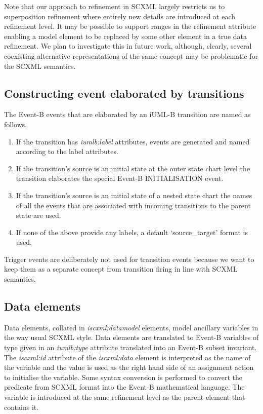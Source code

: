 Note that our approach to refinement in SCXML largely restricts us to superposition 
refinement where entirely new details are introduced at each refinement level.  
It may be possible to support ranges in the refinement attribute enabling a model 
element to be replaced by some other element in a true data refinement. We plan to 
investigate this in future work, although, clearly, several coexisting alternative 
representations of the same concept may be problematic for the SCXML semantics.

\subsection{Constructing event elaborated by transitions}
The Event-B events that are elaborated by an iUML-B  transition are named as follows. 

\begin{enumerate}
\item If the transition has \emph{iumlb:label} attributes, events are generated 
and named according to the label attributes.
\item If the transition's source is an initial state at the outer state chart 
level the transition elaborates the special Event-B INITIALISATION event. 
\item If the transition's source is an initial state of a nested state chart 
the names of all the events that are associated with incoming transitions to 
the parent state are used.
\item If none of the above provide any labels, a default  `source\_target' format is used.
\end{enumerate}

Trigger events are deliberately not used for transition events because we 
want to keep them as a separate concept from transition firing in line 
with SCXML semantics.

\subsection{Data elements}
Data elements, collated in \emph{iscxml:datamodel} elements, model ancillary 
variables in the way usual SCXML style. Data elements are translated to 
Event-B variables of type given in an \emph{iumlb:type} attribute translated 
into an Event-B subset invariant.  The \emph{iscxml:id} attribute of the 
\emph{iscxml:data} element is interpreted as the name of the variable and 
the value is used as the right hand side of an assignment action to initialise 
the variable.  Some syntax conversion is performed to convert the predicate from 
SCXML format into the Event-B mathematical language. The variable is introduced 
at the same refinement level as the parent element that contains it.



